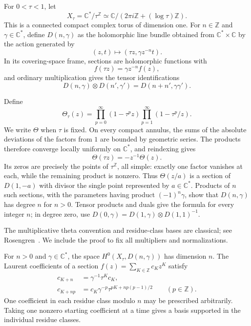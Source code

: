 For $0<\tau<1$, let
\[
 X_\tau=\mathbb{C}^*/\tau^{\mathbb{Z}}
   \simeq\mathbb{C}/(2\pi i\mathbb{Z}+(\log\tau)\mathbb{Z}).
\]
This is a connected compact complex torus of dimension one. For $n\in\mathbb{Z}$ and $\gamma\in\mathbb{C}^*$, define $D(n,\gamma)$ as the holomorphic line bundle obtained from $\mathbb{C}^*\times\mathbb{C}$ by the action generated by
\[
 (z,t)\longmapsto(\tau z,\gamma z^{-n}t).
\]
In its covering-space frame, sections are holomorphic functions with
\[
 f(\tau z)=\gamma z^{-n}f(z),
\]
and ordinary multiplication gives the tensor identifications
\[
 D(n,\gamma)\otimes D(n',\gamma')
   =D(n+n',\gamma\gamma').
\]

Define
\begin{equation}
 \Theta_\tau(z)
 =\prod_{p=0}^{\infty}(1-\tau^p z)
  \prod_{p=1}^{\infty}(1-\tau^p/z).
\label{eq:theta-product}
\end{equation}
We write $\Theta$ when $\tau$ is fixed. On every compact annulus, the sums of the absolute deviations of the factors from $1$ are bounded by geometric series. The products therefore converge locally uniformly on $\mathbb{C}^*$, and reindexing gives
\[
 \Theta(\tau z)=-z^{-1}\Theta(z).
\]
Its zeros are precisely the points of $\tau^{\mathbb{Z}}$, all simple: exactly one factor vanishes at each, while the remaining product is nonzero. Thus $\Theta(z/a)$ is a section of $D(1,-a)$ with divisor the single point represented by $a\in\mathbb{C}^*$. Products of $n$ such sections, with the parameters having product $(-1)^n\gamma$, show that $D(n,\gamma)$ has degree $n$ for $n>0$. Tensor products and duals give the formula for every integer $n$; in degree zero, use $D(0,\gamma)=D(1,\gamma)\otimes D(1,1)^{-1}$.

The multiplicative theta convention and residue-class bases are classical; see Rosengren~\cite[arXiv version, Section~1.2 and Exercise~1.6.5]{Rosengren2020}. We include the proof to fix all multipliers and normalizations.

\begin{lemma}
\label{lem:torus-sections}
For $n>0$ and $\gamma\in\mathbb{C}^*$, the space $H^0(X_\tau,D(n,\gamma))$ has dimension $n$. The Laurent coefficients of a section $f(z)=\sum_{K\in\mathbb{Z}}c_Kz^K$ satisfy
\begin{equation}
\begin{split}
 c_{K+n}&=\gamma^{-1}\tau^Kc_K,\\
 c_{K+np}&=c_K\gamma^{-p}
       \tau^{pK+np(p-1)/2}\qquad(p\in\mathbb{Z}).
\end{split}
\label{eq:laurent-recurrence}
\end{equation}
One coefficient in each residue class modulo $n$ may be prescribed arbitrarily. Taking one nonzero starting coefficient at a time gives a basis supported in the individual residue classes.
\end{lemma}

